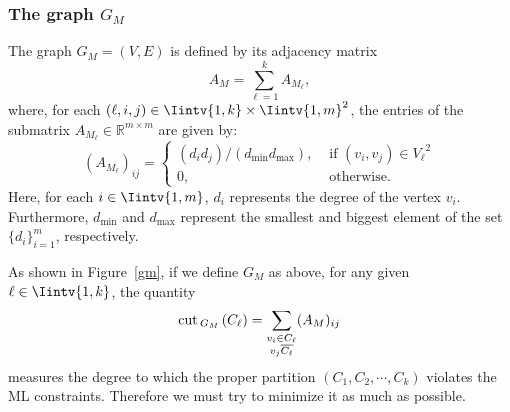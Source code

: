 \subsubsection*{The graph $G_M$}

\begin{definition}
   The graph $G_M = (V,E)$ is defined by its adjacency matrix 
   \begin{equation}\label{am}
   A_M = \sum_{\ell = 1}^k A_{M_{\ell}},
\end{equation}
   where, for each $(\ell, i, j) \in \Iintv{1,k} \times \Iintv{1, m}^2$, the entries of the submatrix $A_{M_{\ell}} \in \mathbb R^{m \times m}$ are given by:
   \begin{equation}
      (A_{M_{\ell}})_{ij} =
      \begin{cases}
         (d_i d_j) / (d_{\min} d_{\max}), & \text{ if $(v_i, v_j) \in {V_{\ell}}^2$} \\
         0, & \text{ otherwise.}
      \end{cases}
\end{equation}
Here, for each $i \in \Iintv{1,m}$, $d_i$ represents the degree of the vertex $v_i$. 
Furthermore, $d_{\min}$ and $d_{\max}$ represent the smallest and biggest element of the set $\{ d_i \}_{i=1}^m$, respectively.
\end{definition}

As shown in Figure~\vref{gm}, if we define $G_M$ as above, for any given $\ell \in \Iintv{1,k}$, the quantity
\begin{equation}
   \operatorname{cut\,}_{G_M\,}(C_{\ell}) = \sum_{\substack{v_i \in C_{\ell} \\ v_j \overline{C_{\ell}}}} (A_M)_{ij} 
\end{equation}
measures the degree to which the proper partition $(C_1, C_2, \cdots, C_k)$ violates the ML constraints.
Therefore we must try to minimize it as much as possible.

